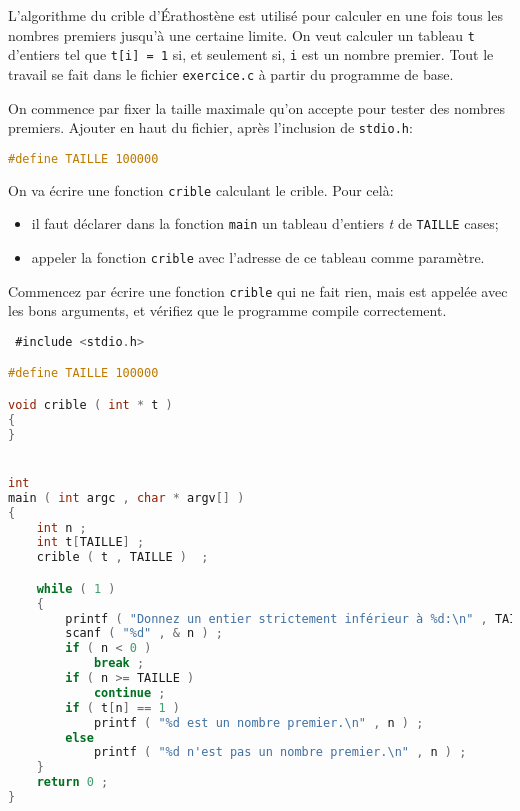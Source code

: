 \titre{\ttableaux}




\prerequis {}

L'algorithme du crible d'Érathostène est utilisé pour calculer en une
fois tous les nombres premiers jusqu'à une certaine limite. On veut
calculer un tableau \texttt{t} d'entiers tel que \texttt{t[i] = 1} si,
et seulement si, \texttt{i} est un nombre premier. Tout le travail se
fait dans le fichier \texttt{exercice.c} à partir
du programme de base.

\question On commence par fixer la taille maximale qu'on accepte pour
tester des nombres premiers. Ajouter en haut du fichier, après
l'inclusion de \texttt{stdio.h}:
\begin{lstlisting}[language=C]
#define TAILLE 100000
\end{lstlisting}

\question On va écrire une fonction \texttt{crible} calculant le crible. Pour celà:
\begin{itemize}
\item il faut déclarer dans la fonction \texttt{main} un tableau
  d'entiers \emph{t} de \texttt{TAILLE} cases;
\item appeler la fonction \texttt{crible} avec l'adresse de ce tableau
  comme paramètre.
\end{itemize}
Commencez par écrire une fonction \texttt{crible} qui ne fait rien,
mais est appelée avec les bons arguments, et vérifiez que le programme
compile correctement.

\begin{solutioncachee}
  \begin{lstlisting}[language=C]
 #include <stdio.h>

#define TAILLE 100000

void crible ( int * t )
{
}


int
main ( int argc , char * argv[] )
{
    int n ;
    int t[TAILLE] ;
    crible ( t , TAILLE )  ;

    while ( 1 )
    {
        printf ( "Donnez un entier strictement inférieur à %d:\n" , TAILLE ) ;
        scanf ( "%d" , & n ) ;
        if ( n < 0 )
            break ;
        if ( n >= TAILLE )
            continue ;
        if ( t[n] == 1 )
            printf ( "%d est un nombre premier.\n" , n ) ;
        else
            printf ( "%d n'est pas un nombre premier.\n" , n ) ;
    }
    return 0 ;
} 
  \end{lstlisting}
\end{solutioncachee}

